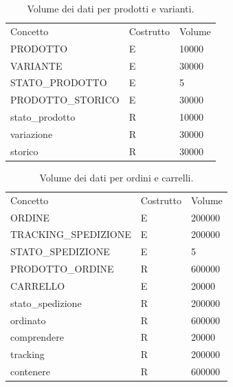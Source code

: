 \documentclass[a4paper,12pt]{report}
\begin{document}
	\begin{table}[H]
		\centering
		\begin{tabular}{|lll|}
			\hline
			\rowcolor[HTML]{FFCE93}
			\multicolumn{3}{|l|}{\cellcolor[HTML]{FFCE93}Prodotti e Varianti} \\ \hline
			\rowcolor[HTML]{CBCEFB}
			Concetto          & Costrutto & Volume           \\ \hline
			PRODOTTO          & E         & 10000            \\ \hline
			VARIANTE          & E         & 30000            \\ \hline
			STATO\_PRODOTTO   & E         & 5                \\ \hline
			PRODOTTO\_STORICO & E         & 30000            \\ \hline
			stato\_prodotto   & R         & 10000            \\ \hline
			variazione        & R         & 30000            \\ \hline
			storico           & R         & 30000            \\ \hline
		\end{tabular}
		\caption{Volume dei dati per prodotti e varianti.}
	\end{table}
	
	\begin{table}[H]
		\centering
		\begin{tabular}{|lll|}
			\hline
			\rowcolor[HTML]{FFCE93}
			\multicolumn{3}{|l|}{\cellcolor[HTML]{FFCE93}Ordini e Carrelli} \\ \hline
			\rowcolor[HTML]{CBCEFB}
			Concetto          		& Costrutto & Volume           \\ \hline
			ORDINE            		& E         & 200000           \\ \hline
			TRACKING\_SPEDIZIONE 	& E      	& 200000           \\ \hline
			STATO\_SPEDIZIONE   	& E         & 5                \\ \hline
			PRODOTTO\_ORDINE  		& R         & 600000           \\ \hline
			CARRELLO          		& E         & 20000            \\ \hline
			stato\_spedizione   	& R         & 200000           \\ \hline
			ordinato				& R			& 600000 		   \\ \hline
			comprendere       		& R         & 20000            \\ \hline
			tracking 				& R      	& 200000           \\ \hline
			contenere 				& R      	& 600000           \\ \hline
		\end{tabular}
		\caption{Volume dei dati per ordini e carrelli.}
	\end{table}
	
\end{document}
